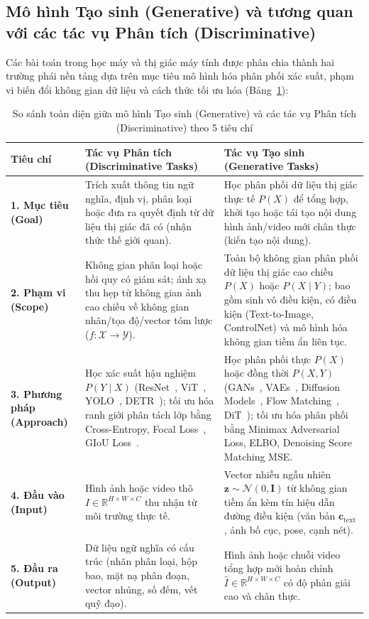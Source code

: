 \subsection{Mô hình Tạo sinh (Generative) và tương quan với các tác vụ Phân tích (Discriminative)}

Các bài toán trong học máy và thị giác máy tính được phân chia thành hai trường phái nền tảng dựa trên mục tiêu mô hình hóa phân phối xác suất, phạm vi biến đổi không gian dữ liệu và cách thức tối ưu hóa (Bảng~\ref{tab:comp_disc_gen}):

\begin{table}[H]
\centering
\small
\caption{So sánh toàn diện giữa mô hình Tạo sinh (Generative) và các tác vụ Phân tích (Discriminative) theo 5 tiêu chí}
\label{tab:comp_disc_gen}
\renewcommand{\arraystretch}{1.3}
\begin{tabularx}{\textwidth}{|p{2.8cm}|X|X|}
\hline
\textbf{Tiêu chí} & \textbf{Tác vụ Phân tích (Discriminative Tasks)} & \textbf{Tác vụ Tạo sinh (Generative Tasks)} \\
\hline
\textbf{1. Mục tiêu (Goal)} & Trích xuất thông tin ngữ nghĩa, định vị, phân loại hoặc đưa ra quyết định từ dữ liệu thị giác đã có (nhận thức thế giới quan). & Học phân phối dữ liệu thị giác thực tế $P(X)$ để tổng hợp, khởi tạo hoặc tái tạo nội dung hình ảnh/video mới chân thực (kiến tạo nội dung). \\
\hline
\textbf{2. Phạm vi (Scope)} & Không gian phân loại hoặc hồi quy có giám sát; ánh xạ thu hẹp từ không gian ảnh cao chiều về không gian nhãn/tọa độ/vector tóm lược ($f: \mathcal{X} \rightarrow \mathcal{Y}$). & Toàn bộ không gian phân phối dữ liệu thị giác cao chiều $P(X)$ hoặc $P(X \mid Y)$; bao gồm sinh vô điều kiện, có điều kiện (Text-to-Image, ControlNet) và mô hình hóa không gian tiềm ẩn liên tục. \\
\hline
\textbf{3. Phương pháp (Approach)} & Học xác suất hậu nghiệm $P(Y \mid X)$ (ResNet~\citep{he2016deep}, ViT~\citep{dosovitskiy2020image}, YOLO~\citep{redmon2016you}, DETR~\citep{carion2020end}); tối ưu hóa ranh giới phân tách lớp bằng Cross-Entropy, Focal Loss~\citep{lin2017focal}, GIoU Loss~\citep{rezatofighi2019generalized}. & Học phân phối thực $P(X)$ hoặc đồng thời $P(X, Y)$ (GANs~\citep{goodfellow2014generative}, VAEs~\citep{kingma2014auto}, Diffusion Models~\citep{ho2020denoising}, Flow Matching~\citep{lipman2023flow}, DiT~\citep{peebles2023scalable}); tối ưu hóa phân phối bằng Minimax Adversarial Loss, ELBO, Denoising Score Matching MSE. \\
\hline
\textbf{4. Đầu vào (Input)} & Hình ảnh hoặc video thô $I \in \mathbb{R}^{H \times W \times C}$ thu nhận từ môi trường thực tế. & Vector nhiễu ngẫu nhiên $\mathbf{z} \sim \mathcal{N}(0, \mathbf{I})$ từ không gian tiềm ẩn kèm tín hiệu dẫn đường điều kiện (văn bản $\mathbf{c}_{\text{text}}$, ảnh bố cục, pose, cạnh nét). \\
\hline
\textbf{5. Đầu ra (Output)} & Dữ liệu ngữ nghĩa có cấu trúc (nhãn phân loại, hộp bao, mặt nạ phân đoạn, vector nhúng, số đếm, vết quỹ đạo). & Hình ảnh hoặc chuỗi video tổng hợp mới hoàn chỉnh $\hat{I} \in \mathbb{R}^{H \times W \times C}$ có độ phân giải cao và chân thực. \\
\hline
\end{tabularx}
\end{table}
